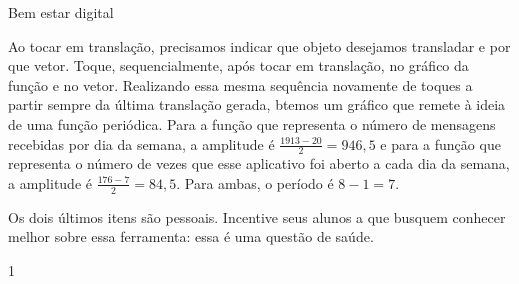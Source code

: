 \begin{answer}{Bem estar digital}
{\begin{enumerate}[left=7.5pt, wide]

	Ao tocar em translação, precisamos indicar que objeto desejamos transladar e por que vetor. Toque, sequencialmente, após tocar em translação, no gráfico da função e no vetor. Realizando essa mesma sequência novamente de toques a partir sempre da última translação gerada, btemos um gráfico que remete à ideia de uma função periódica. Para a função que representa o número de mensagens recebidas por dia da semana, a amplitude é $\frac{1913−20}{2}= 946{,}5$ e para a função que representa o número de vezes que esse aplicativo foi aberto a cada dia da semana, a amplitude é $\frac{176−7}{2} = 84{,}5$. Para ambas, o período é $8 - 1 = 7$.

	Os dois últimos itens são pessoais. Incentive seus alunos a que busquem conhecer melhor sobre essa ferramenta: essa é uma questão de saúde.
	\end{enumerate}
}{1}
\end{answer}

